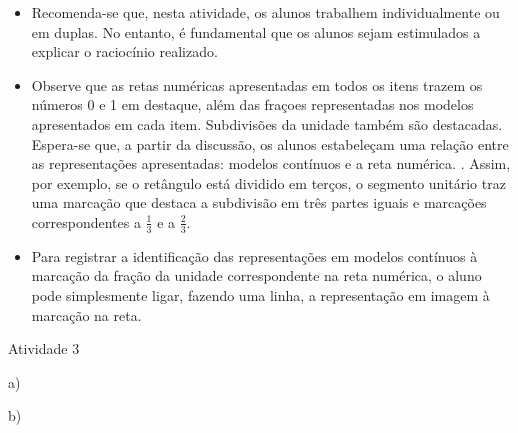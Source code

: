 \begin{multicols}{2}
\begin{itemize} %
    \item       Recomenda-se que, nesta atividade, os alunos trabalhem individualmente ou em duplas. No entanto, é fundamental que os alunos sejam estimulados a explicar o raciocínio realizado.
    \item       Observe que as retas numéricas apresentadas em todos os itens trazem os números 0 e 1 em destaque, além das fraçoes representadas nos modelos apresentados em cada item. Subdivisões da unidade também são destacadas. Espera-se que, a partir da discussão, os alunos estabeleçam uma relação entre as representações apresentadas: modelos contínuos e a reta numérica. . Assim, por exemplo, se o retângulo está dividido em terços, o segmento unitário traz uma marcação que destaca a subdivisão em três partes iguais e marcações correspondentes a       $\frac{1}{3}$       e a       $\frac{2}{3}$. 
    \item       Para registrar a identificação das representações em modelos contínuos à marcação da fração da unidade correspondente na reta numérica, o aluno pode simplesmente ligar, fazendo uma linha, a representação em imagem à marcação na reta.
\end{itemize} %
  
  


\begin{resposta*} {Atividade 3}
 
a) 
 
\vspace{.3cm}
 
b)
 
\end{resposta*}
\end{multicols}
